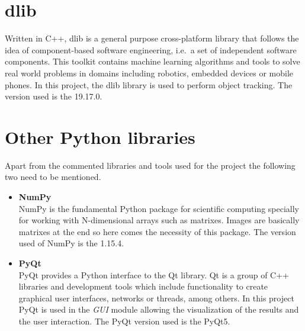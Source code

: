 \section{dlib}
Written in C++, dlib is a general purpose cross-platform library that follows the idea of component-based software engineering, i.e.\ a set of independent software components. This toolkit contains machine learning algorithms and tools to solve real world problems in domains including robotics, embedded devices or mobile phones. In this project, the dlib library is used to perform object tracking. The version used is the 19.17.0.
\section{Other Python libraries}
Apart from the commented libraries and tools used for the project the following two need to be mentioned.
\begin{itemize}
\item \textbf{NumPy}\\
NumPy is the fundamental Python package for scientific computing specially for working with N-dimensional arrays such as matrixes. Images are basically matrixes at the end so here comes the necessity of this package. The version used of NumPy is the 1.15.4.
\item \textbf{PyQt}\\
PyQt provides a Python interface to the Qt library. Qt is a group of C++ libraries and development tools which include functionality to create graphical user interfaces, networks or threads, among others. In this project PyQt is used in the \textit{GUI} module allowing the visualization of the results and the user interaction. The PyQt version used is the PyQt5.
\end{itemize}
